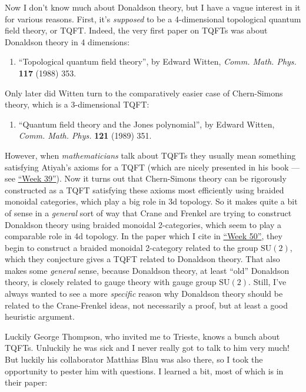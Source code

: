 \documentclass{article}
\def\tightlist{}
\begin{document}
Now I don't know much about Donaldson theory, but I have a vague
interest in it for various reasons. First, it's \emph{supposed} to be a
4-dimensional topological quantum field theory, or TQFT. Indeed, the
very first paper on TQFTs was about Donaldson theory in 4 dimensions:

\begin{enumerate}
\def\labelenumi{\arabic{enumi})}
\tightlist
\item
  ``Topological quantum field theory'', by Edward Witten, \emph{Comm.
  Math. Phys.} \textbf{117} (1988) 353.
\end{enumerate}

Only later did Witten turn to the comparatively easier case of
Chern-Simons theory, which is a 3-dimensional TQFT:

\begin{enumerate}
\def\labelenumi{\arabic{enumi})}
\setcounter{enumi}{1}
\tightlist
\item
  ``Quantum field theory and the Jones polynomial'', by Edward Witten,
  \emph{Comm. Math. Phys.} \textbf{121} (1989) 351.
\end{enumerate}

However, when \emph{mathematicians} talk about TQFTs they usually mean
something satisfying Atiyah's axioms for a TQFT (which are nicely
presented in his book --- see \protect\hyperlink{week39}{``Week 39''}).
Now it turns out that Chern-Simons theory can be rigorously constructed
as a TQFT satisfying these axioms most efficiently using braided
monoidal categories, which play a big role in 3d topology. So it makes
quite a bit of sense in a \emph{general} sort of way that Crane and
Frenkel are trying to construct Donaldson theory using braided monoidal
2-categories, which seem to play a comparable role in 4d topology. In
the paper which I cite in \protect\hyperlink{week50}{``Week 50''}, they
begin to construct a braided monoidal 2-category related to the group
\(\mathrm{SU}(2)\), which they conjecture gives a TQFT related to
Donaldson theory. That also makes some \emph{general} sense, because
Donaldson theory, at least ``old'' Donaldson theory, is closely related
to gauge theory with gauge group \(\mathrm{SU}(2)\). Still, I've always
wanted to see a more \emph{specific} reason why Donaldson theory should
be related to the Crane-Frenkel ideas, not necessarily a proof, but at
least a good heuristic argument.

Luckily George Thompson, who invited me to Trieste, knows a bunch about
TQFTs. Unluckily he was sick and I never really got to talk to him very
much! But luckily his collaborator Matthias Blau was also there, so I
took the opportunity to pester him with questions. I learned a bit, most
of which is in their paper:
\end{document}
